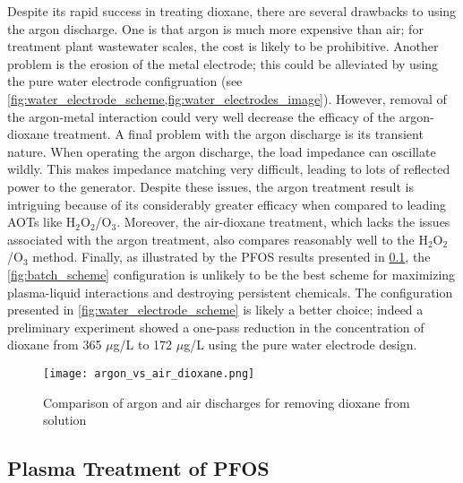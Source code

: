 Despite its rapid success in treating dioxane, there are several drawbacks to using the argon discharge. One is that argon is much more expensive than air; for treatment plant wastewater scales, the cost is likely to be prohibitive. Another problem is the erosion of the metal electrode; this could be alleviated by using the pure water electrode configruation (see \cref{fig:water_electrode_scheme,fig:water_electrodes_image}). However, removal of the argon-metal interaction could very well decrease the efficacy of the argon-dioxane treatment. A final problem with the argon discharge is its transient nature. When operating the argon discharge, the load impedance can oscillate wildly. This makes impedance matching very difficult, leading to lots of reflected power to the generator. Despite these issues, the argon treatment result is intriguing because of its considerably greater efficacy when compared to leading AOTs like H$_2$O$_2$/O$_3$. Moreover, the air-dioxane treatment, which lacks the issues associated with the argon treatment, also compares reasonably well to the H$_2$O$_2$/O$_3$ method. Finally, as illustrated by the PFOS results presented in \cref{sec:PFOS}, the \cref{fig:batch_scheme} configuration is unlikely to be the best scheme for maximizing plasma-liquid interactions and destroying persistent chemicals. The configuration presented in \cref{fig:water_electrode_scheme} is likely a better choice; indeed a preliminary experiment showed a one-pass reduction in the concentration of dioxane from 365 $\mu$g/L to 172 $\mu$g/L using the pure water electrode design.

\begin{figure}[htbp]
  \centering
  \texttt{[image: argon\_vs\_air\_dioxane.png]}
  \caption{Comparison of argon and air discharges for removing dioxane from solution}
  \label{fig:diox_compare_argon_air}
\end{figure}

\subsection{Plasma Treatment of PFOS}
\label{sec:PFOS}

